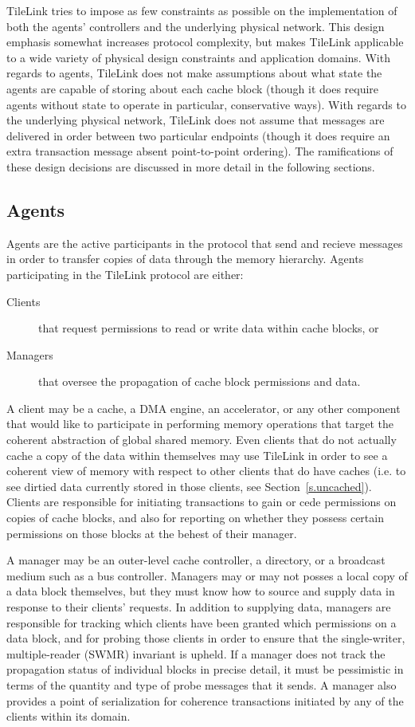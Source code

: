 TileLink tries to impose as few constraints as possible on the implementation of both the agents' controllers and the underlying physical network.
This design emphasis somewhat increases protocol complexity, but makes TileLink applicable to a wide variety of physical design constraints and application domains.
With regards to agents, TileLink does not make assumptions about what state the agents are capable of storing about each cache block
(though it does require agents without state to operate in particular, conservative ways).
With regards to the underlying physical network, TileLink does not assume that messages are delivered in order between two particular endpoints
(though it does require an extra transaction message absent point-to-point ordering).
The ramifications of these design decisions are discussed in more detail in the following sections.

\subsection{Agents}

Agents are the active participants in the protocol that send and recieve messages in order to transfer copies of data through the memory hierarchy.
Agents participating in the TileLink protocol are either:
\begin{description}
\item[Clients] that request permissions to read or write data within cache blocks, or
\item[Managers] that oversee the propagation of cache block permissions and data.
\end{description}

A client may be a cache, a DMA engine, an accelerator, or any other component that would like to participate in performing memory operations that target the coherent abstraction of global shared memory.
Even clients that do not actually cache a copy of the data within themselves may use TileLink in order to see a coherent view of memory with respect to other clients that do have caches
(i.e. to see dirtied data currently stored in those clients, see Section~\ref{s.uncached}).
Clients are responsible for initiating transactions to gain or cede permissions on copies of cache blocks, and also for reporting on whether they possess certain permissions on those blocks
at the behest of their manager.

A manager may be an outer-level cache controller, a directory, or a broadcast medium such as a bus controller.
Managers may or may not posses a local copy of a data block themselves, but they must know how to source and supply data in response to their clients' requests.
In addition to supplying data, managers are responsible for tracking which clients have been granted which permissions on a data block,
and for probing those clients in order to ensure that the 
single-writer, multiple-reader (SWMR) invariant \cite{sorin2011primer} is upheld.
If a manager does not track the propagation status of individual blocks in precise detail, it must be pessimistic
in terms of the quantity and type of probe messages that it sends.
A manager also provides a point of serialization for coherence transactions
initiated by any of the clients within its domain.

